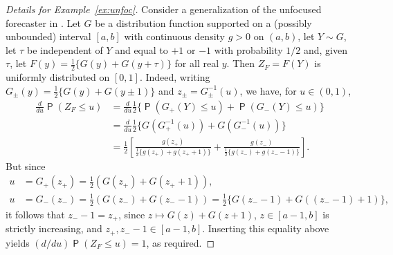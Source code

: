 \documentclass[12pt]{article}
\newcommand{\Q}{\operatorname{\mathsf{P}}}
\newcommand{\1}{\mathbf{1}} %
\theoremstyle{definition}
\begin{document}
\begin{proof}[Details for Example~\ref{ex:unfoc}]
Consider a generalization of the unfocused forecaster in \cite{GneitingEtAl2007}. Let $G$ be a distribution function supported on a (possibly unbounded) interval $[a,b]$ with continuous density $g > 0$ on $(a,b)$, let $Y \sim G$, let $\tau$ be independent of $Y$ and equal to $+1$ or $-1$ with probability $1/2$ and, given $\tau$, let $F(y) = \frac{1}{2} \{G(y)+G(y+\tau)\}$ for all real $y$. Then $Z_{F} = F(Y)$ is uniformly distributed on $[0, 1]$. Indeed, writing $G_\pm(y) = \frac{1}{2} \{G(y)+G(y\pm 1)\}$ and $z_\pm = G_\pm^{-1}(u)$, we have, for $u \in (0, 1)$,
\begin{align*}
    \frac{d}{du} \Q(Z_{F} \le u)
    &= \frac{d}{du} \frac{1}{2} \{ \Q(G_+(Y) \le u) + \Q(G_-(Y) \le u) \} \\
    &= \frac{d}{du} \frac{1}{2} \{ G(G_+^{-1}(u)) + G(G_-^{-1}(u)) \} \\
    &= \frac{1}{2}
    \left[ \frac{g(z_+)}{\frac{1}{2}\{g(z_+)+g(z_++1)\}}
    + \frac{g(z_-)}{\frac{1}{2}\{g(z_-)+g(z_--1)\}}
    \right].
\end{align*}
But since
\begin{align*}
    u &= G_+(z_+) = \frac{1}{2} (G(z_+) + G(z_++1)), \\
    u &= G_-(z_-) = \frac{1}{2} (G(z_-) + G(z_--1)) = \frac{1}{2} \{G(z_--1) + G((z_--1)+1)\},
\end{align*}
it follows that $z_--1 = z_+$, since $z \mapsto G(z) + G(z + 1)$, $z \in [a-1,b]$ is strictly increasing, and $z_+, z_- - 1 \in [a-1,b]$. Inserting this equality above yields $(d/du)\Q(Z_{F} \le u) = 1$, as required. 


\end{proof}
\end{document}
